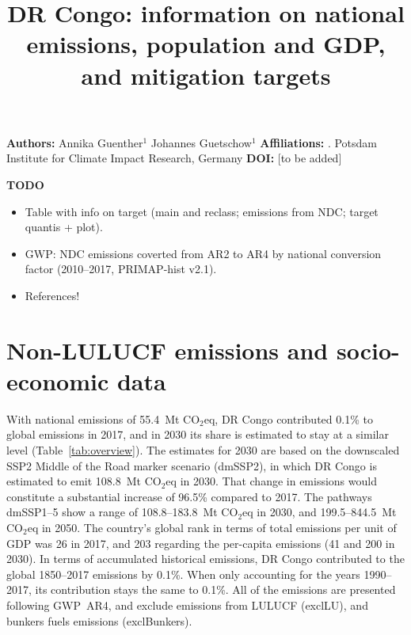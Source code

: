 \documentclass[12pt]{article}
\title{ \bfseries \color{PIKorange} DR Congo: information on national emissions, population and GDP, and mitigation targets}
\begin{document}
 \maketitle

 \noindent \textbf{Authors:} \newline
 \indent Annika Guenther$^{1}$ \newline
 \indent Johannes Guetschow$^{1}$ \newline
 \noindent \textbf{Affiliations:} \newline
 . Potsdam Institute for Climate Impact Research, Germany \newline
 \noindent \textbf{DOI:} [to be added] \newline

 \textbf{TODO}
 \begin{itemize}
 \item Table with info on target (main and reclass; emissions from NDC; target quantis + plot).
 \item GWP: NDC emissions coverted from AR2 to AR4 by national conversion factor (2010--2017, PRIMAP-hist v2.1).
 \item References!
 \end{itemize}

 \newpage %
 \section{Non-LULUCF emissions and socio-economic data}
 \label{sec:nonLULUCFSocioEco}
 With national emissions of 55.4~Mt CO$_2$eq, DR Congo contributed 0.1\% to global emissions in 2017, and in 2030 its share is estimated to stay at a similar level (Table~\ref{tab:overview}).
 The estimates for 2030 are based on the downscaled SSP2 Middle of the Road marker scenario (dmSSP2), in which DR Congo is estimated to emit 108.8~Mt CO$_2$eq in 2030.
 That change in emissions would constitute a substantial increase of 96.5\% compared to 2017. 
 The pathways dmSSP1--5 show a range of 108.8--183.8~Mt CO$_2$eq in 2030, and 199.5--844.5~Mt CO$_2$eq in 2050.
 The country's global rank in terms of total emissions per unit of GDP was 26 in 2017, and 203 regarding the per-capita emissions (41 and 200 in 2030).
 In terms of accumulated historical emissions, DR Congo contributed to the global 1850--2017 emissions by 0.1\%. 
 When only accounting for the years 1990--2017, its contribution stays the same to 0.1\%.
 All of the emissions are presented following GWP~AR4, and exclude emissions from LULUCF (exclLU), and bunkers fuels emissions (exclBunkers).
\end{document}
